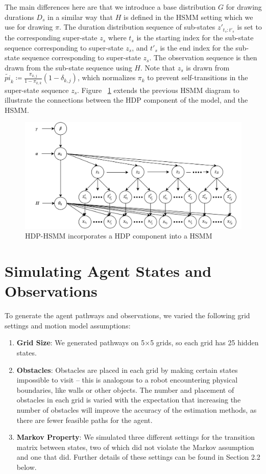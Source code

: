 \documentclass{article}
\begin{document}
The main differences here are that we introduce a base distribution $G$ for drawing durations $D_s$ in a similar way that $H$ is defined in the HSMM setting which we use for drawing $\pi$. The duration distribution sequence of sub-states $z'_{t_{s}:t'_{s}}$ is set to the corresponding super-state $z_{s}$ where $t_{s}$ is the starting index for the sub-state sequence corresponding to super-state $z_s$, and $t'_{s}$ is the end index for the sub-state sequence corresponding to super-state $z_s$. The observation sequence is then drawn from the sub-state sequence using $H$. Note that $z_s$ is drawn from $\tilde{pi}_{k} \coloneqq \frac{\pi_{k,j}}{1-\pi_{k,k}}(1 - \delta_{k,j})$, which normalizes $\pi_k$ to prevent self-transitions in the super-state sequence $z_s$. Figure ~\ref{fig:hdphsmm} extends the previous HSMM diagram to illustrate the connections between the HDP component of the model, and the HSMM.

\begin{figure}[H]
\centering
\includegraphics[scale=0.10]{images/hdphsmm.png}
\caption{HDP-HSMM incorporates a HDP component into a HSMM}
\label{fig:hdphsmm}
\end{figure}

\section{Simulating Agent States and Observations}

To generate the agent pathways and observations, we varied the following grid settings and motion model assumptions:

\begin{enumerate}
	\item \textbf{Grid Size}: We generated pathways on 5$\times$5 grids, so each grid has 25 hidden states.
	\item \textbf{Obstacles}: Obstacles are placed in each grid by making certain states impossible to visit -- this is analogous to a robot encountering physical boundaries, like walls or other objects. The number and placement of obstacles in each grid is varied with the expectation that increasing the number of obstacles will improve the accuracy of the estimation methods, as there are fewer feasible paths for the agent.
	\item \textbf{Markov Property}: We simulated three different settings for the transition matrix between states, two of which did not violate the Markov assumption and one that did. Further details of these settings can be found in Section 2.2 below.
\end{enumerate}
\end{document}
